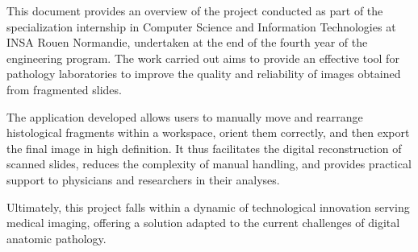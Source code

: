 \documentclass[11pt,a4paper]{report}
\begin{document}
This document provides an overview of the project conducted as part of the specialization internship in Computer Science and Information Technologies at INSA Rouen Normandie, undertaken at the end of the fourth year of the engineering program. The work carried out aims to provide an effective tool for pathology laboratories to improve the quality and reliability of images obtained from fragmented slides.

The application developed allows users to manually move and rearrange histological fragments within a workspace, orient them correctly, and then export the final image in high definition. It thus facilitates the digital reconstruction of scanned slides, reduces the complexity of manual handling, and provides practical support to physicians and researchers in their analyses.

Ultimately, this project falls within a dynamic of technological innovation serving medical imaging, offering a solution adapted to the current challenges of digital anatomic pathology.
\end{document}
